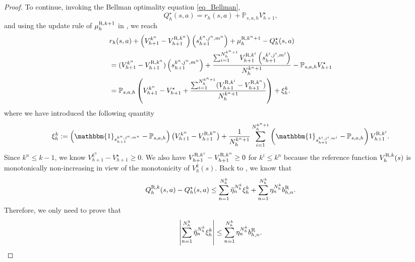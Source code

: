 \documentclass{article}
\newcommand{\R}{\textnormal{R}}
\begin{document}
\begin{proof}
    To continue, invoking the Bellman optimality equation \eqref{eq_Bellman},
    \begin{equation*}
        Q_h^{\star}(s, a) = r_h(s, a) + \mathbb{P}_{s,a,h} V_{h+1}^{\star},
    \end{equation*}
    and using the update rule of $\mu_h^{\R,k+1}$ in , we reach
    \begin{align*}
        &r_h(s, a) + \left(V_{h+1}^{k^n}-V_{h+1}^{\R,k^n}\right)\left(s_{h+1}^{k^n,j^n,m^n}\right)   + \mu_h^{\R,k^n+1}- Q_h^{\star}(s, a) \nonumber\\
        &= (V_{h+1}^{k^n}-V_{h+1}^{\R,k^n})\left(s_{h+1}^{k^n,j^n,m^n}\right) +\frac{\sum_{i=1}^{N_h^{k^n+1}}V_{h+1}^{\R,k^i}\left(s_{h+1}^{k^i,j^i,m^i}\right)}{N_h^{k^n+1}}-\mathbb{P}_{s,a,h} V_{h+1}^{\star} \nonumber\\
        & = \mathbb{P}_{s,a,h}\left(V_{h+1}^{k^n}-V_{h+1}^{\star} + \frac{\sum_{i=1}^{N_h^{k^n+1}}(V_{h+1}^{\R,k^i}-V_{h+1}^{\R,k^n})} {N_h^{k^n+1}}\right) + \xi_h^k.
    \end{align*}
    where we have introduced the following quantity
    \begin{equation*}
        \xi_h^k := \left(\mathbbm{1}_{s_{h+1}^{k^n,j^n,m^n}}-\mathbb{P}_{s,a,h}\right) \big(V_{h+1}^{k^n} - V_{h+1}^{\R,k^n} \big) + \frac{1} {N_h^{k^n+1}}\sum_{i=1}^{N_h^{k^n+1}}\left(\mathbbm{1}_{s_{h+1}^{k^i,j^i,m^i}}-\mathbb{P}_{s,a,h}\right)V_{h+1}^{\R,k^i}.
    \end{equation*}
    Since $k^n \leq k-1$, we know $V_{h+1}^{k^n}-V_{h+1}^{\star} \geq 0$. We also have $V_{h+1}^{\R,k^i}-V_{h+1}^{\R,k^n} \geq 0$ for $k^i \leq k^n$ because the reference function $V_h^{\R,k}(s)$ is monotonically non-increasing in view of the monotonicity of $V_h^{k}(s)$. Back to , we know that
    $$Q_h^{\R,k}(s, a) - Q_h^{\star}(s, a) \leq \sum_{n=1}^{N_h^k} \Tilde{\eta}_n^{N_h^k}\xi_h^k + \sum_{n=1}^{N_h^k} \eta_n^{N_h^k}b_{h,n}^{\R}.$$
    Therefore, we only need to prove that
    $$\left|\sum_{n=1}^{N_h^k} \Tilde{\eta}_n^{N_h^k}\xi_h^k \right|\leq \sum_{n=1}^{N_h^k} \eta_n^{N_h^k}b_{h,n}^{\R}.$$


\end{proof}
\end{document}
